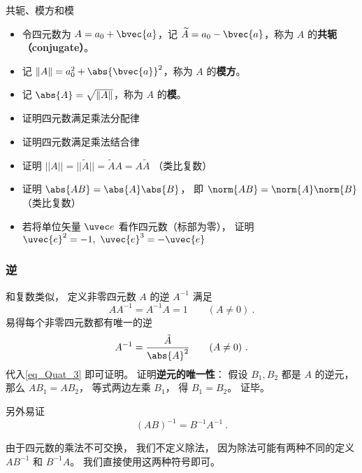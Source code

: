 \begin{definition}{共轭、模方和模}\label{def_Quat_2}
\begin{itemize}
\item 令四元数为 $A=a_0+\bvec{a}$，记 $\widetilde{A}=a_0-\bvec{a}$，称为 $A$ 的\textbf{共轭（conjugate）}。
\item 记 $\Vert A \Vert=a_0^2+ \abs{\bvec{a}}^2$，称为 $A$ 的\textbf{模方}。
\item 记 $\abs{A}=\sqrt{\Vert A\Vert}$，称为 $A$ 的\textbf{模}。
\end{itemize}
\end{definition}

\begin{exercise}{}\label{exe_Quat_1}
\begin{itemize}
\item 证明四元数满足乘法分配律
\item 证明四元数满足乘法结合律
\item 证明 $||A||=||\widetilde{A}||=\widetilde{A}A=A\widetilde{A}$ （类比复数）
\item 证明 $\abs{AB} = \abs{A}\abs{B}$， 即 $\norm{AB} = \norm{A}\norm{B}$ （类比复数）
\item 若将单位矢量 $\uvec e$ 看作四元数（标部为零）， 证明 $\uvec{e}^2=-1,\ \uvec{e}^3=-\uvec{e}$
\end{itemize}
\end{exercise}

\subsubsection{逆}
和复数类似， 定义非零四元数 $A$ 的逆 $A^{-1}$ 满足
\begin{equation}\label{eq_Quat_3}
AA^{-1} = A^{-1}A = 1 \qquad (A \ne 0)~.
\end{equation}
易得每个非零四元数都有唯一的逆
\begin{equation}\label{eq_Quat_4}
A^{-1} = \frac{\tilde A}{\abs{A}^2} \qquad (A \ne 0)~.
\end{equation}
代入\autoref{eq_Quat_3} 即可证明。 证明\textbf{逆元的唯一性}： 假设 $B_1, B_2$ 都是 $A$ 的逆元， 那么 $AB_1 = AB_2$， 等式两边左乘 $B_1$， 得 $B_1 = B_2$。 证毕。

另外易证
\begin{equation}
(AB)^{-1} = B^{-1}A^{-1}~.
\end{equation}

由于四元数的乘法不可交换， 我们不定义除法， 因为除法可能有两种不同的定义 $AB^{-1}$ 和 $B^{-1}A$。 我们直接使用这两种符号即可。

